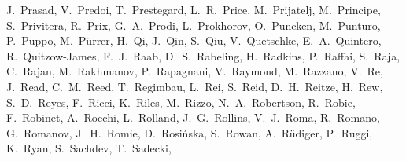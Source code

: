 {J.~Prasad,  %
V.~Predoi,  %
T.~Prestegard,  %
L.~R.~Price,  %
M.~Prijatelj, %
M.~Principe,  %
S.~Privitera,  %
R.~Prix,  %
G.~A.~Prodi, %
L.~Prokhorov,  %
O.~Puncken,  %
M.~Punturo, %
P.~Puppo, %
M.~P\"urrer,  %
H.~Qi,  %
J.~Qin,  %
S.~Qiu,  %
V.~Quetschke,  %
E.~A.~Quintero,  %
R.~Quitzow-James,  %
F.~J.~Raab,  %
D.~S.~Rabeling,  %
H.~Radkins,  %
P.~Raffai,  %
S.~Raja,  %
C.~Rajan,  %
M.~Rakhmanov,  %
P.~Rapagnani, %
V.~Raymond,  %
M.~Razzano, %
V.~Re, %
J.~Read,  %
C.~M.~Reed,  %
T.~Regimbau, %
L.~Rei, %
S.~Reid,  %
D.~H.~Reitze,  %
H.~Rew,  %
S.~D.~Reyes,  %
F.~Ricci, %
K.~Riles,  %
M.~Rizzo,%
N.~A.~Robertson,  %
R.~Robie,  %
F.~Robinet, %
A.~Rocchi, %
L.~Rolland, %
J.~G.~Rollins,  %
V.~J.~Roma,  %
R.~Romano, %
G.~Romanov,  %
J.~H.~Romie,  %
D.~Rosi\'nska, %
S.~Rowan,  %
A.~R\"udiger,  %
P.~Ruggi, %
K.~Ryan,  %
S.~Sachdev,  %
T.~Sadecki,  %
}
